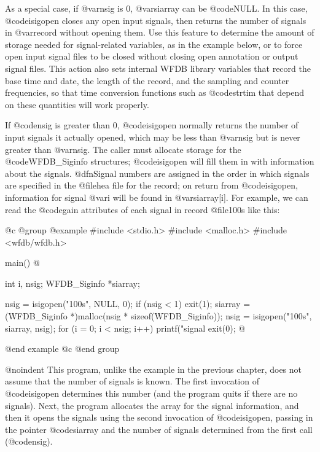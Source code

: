 {{{{{{{{{As a special case, if @var{nsig} is 0, @var{siarray} can be @code{NULL}.
In this case, @code{isigopen} closes any open input signals, then
returns the number of signals in @var{record} without opening them.  Use
this feature to determine the amount of storage needed for
signal-related variables, as in the example below, or to force open
input signal files to be closed without closing open annotation or
output signal files.  This action also sets internal WFDB library
variables that record the base time and date, the length of the record,
and the sampling and counter frequencies, so that time conversion
functions such as @code{strtim} that depend on these quantities will
work properly.

If @code{nsig} is greater than 0, @code{isigopen} normally returns the
number of input signals it actually opened, which may be less than
@var{nsig} but is never greater than @var{nsig}.  The caller must
allocate storage for the @code{WFDB_Siginfo} structures; @code{isigopen}
will fill them in with information about the signals.  @dfn{Signal
numbers} are assigned in the order in which signals are specified in the
@file{hea} file for the record; on return from @code{isigopen},
information for signal @var{i} will be found in @var{siarray[i]}.  For
example, we can read the @code{gain} attributes of each signal in record
@file{100s} like this:

@c @group
@example
#include <stdio.h>
#include <malloc.h>
#include <wfdb/wfdb.h>

main()
@{
    int i, nsig;
    WFDB_Siginfo *siarray;

    nsig = isigopen("100s", NULL, 0);
    if (nsig < 1)
        exit(1);
    siarray = (WFDB_Siginfo *)malloc(nsig * sizeof(WFDB_Siginfo));
    nsig = isigopen("100s", siarray, nsig);
    for (i = 0; i < nsig; i++)
        printf("signal %
    exit(0);
@}
@end example
@c @end group

@noindent
This program, unlike the example in the previous chapter, does not
assume that the number of signals is known.  The first invocation of
@code{isigopen} determines this number (and the program quits if there
are no signals).  Next, the program allocates the array for the signal
information, and then it opens the signals using the second
invocation of @code{isigopen}, passing in the pointer @code{siarray} and the
number of signals determined from the first call (@code{nsig}).

}}}}}}}}}
